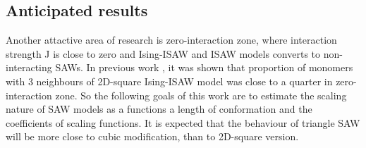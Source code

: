 \subsection{Anticipated results}

Another attactive area of research is zero-interaction zone, where interaction strength J is close to zero and Ising-ISAW and ISAW models converts to non-interacting SAWs.
In previous work \cite{faizullina2021critical}, it was shown that proportion of monomers with 3 neighbours of 2D-square Ising-ISAW model was close to a quarter in zero-interaction zone.
So the following goals of this work are to estimate the scaling nature of SAW models as a functions a length of conformation and the coefficients of scaling functions.
It is expected that the behaviour of triangle SAW will be more close to cubic modification, than to 2D-square version. 


 